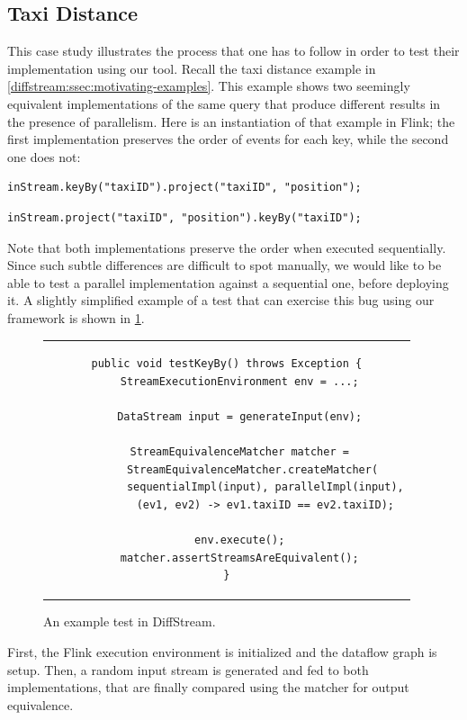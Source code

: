 \subsection{Taxi Distance}
\label{diffstream:ssec:evaluation-keyby}

This case study illustrates the process that one has to follow in
order to test their implementation using our tool. Recall the taxi
distance example in \cref{diffstream:ssec:motivating-examples}. This example
shows two seemingly equivalent implementations of the same query that
produce different results in the presence of parallelism.  Here is an
instantiation of that example in Flink; the first implementation
preserves the order of events for each key, while the second one does
not:

\medskip

\begin{lstlisting}[basicstyle=\ttfamily\small,frame=none]
  inStream.keyBy("taxiID").project("taxiID", "position");
\end{lstlisting}
\begin{lstlisting}[basicstyle=\ttfamily\small,frame=none]
  inStream.project("taxiID", "position").keyBy("taxiID");
\end{lstlisting}

\medskip

Note that both implementations preserve the order when executed
sequentially. Since such subtle differences are difficult to spot
manually, we would like to be able to test a parallel implementation
against a sequential one, before deploying it. A slightly simplified
example of a test that can exercise this bug using our framework is
shown in \cref{diffstream:fig:keybytest}.
\begin{figure}[tb]
    \centering \small
\begin{tabular}{c}
\begin{lstlisting}[linewidth=9.5cm]
public void testKeyBy() throws Exception {
    StreamExecutionEnvironment env = ...;

    DataStream input = generateInput(env);

    StreamEquivalenceMatcher matcher =
        StreamEquivalenceMatcher.createMatcher(
            sequentialImpl(input), parallelImpl(input),
            (ev1, ev2) -> ev1.taxiID == ev2.taxiID);

    env.execute();
    matcher.assertStreamsAreEquivalent();
}
\end{lstlisting}
\end{tabular}
    \caption{An example test in DiffStream.}
    \label{diffstream:fig:keybytest}
\end{figure}{}
%
First, the Flink execution environment is initialized and the dataflow
graph is setup. Then, a random input stream is generated and fed to
both implementations, that are finally compared using the matcher for
output equivalence.

